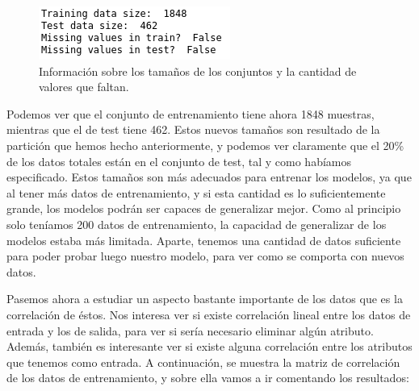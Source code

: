 \documentclass[11pt,a4paper]{article}
\begin{document}
\begin{figure}[H]
    \centering
    \includegraphics[scale=0.6]{img/df_info.png}
    \caption{Información sobre los tamaños de los conjuntos y la cantidad de valores que faltan.}
    \label{fig:train-test-stat}
\end{figure}

Podemos ver que el conjunto de entrenamiento tiene ahora 1848 muestras, mientras que el de test tiene 462. Estos nuevos tamaños son
resultado de la partición que hemos hecho anteriormente, y podemos ver claramente que el 20\% de los datos totales están en el
conjunto de test, tal y como habíamos especificado. Estos tamaños son más adecuados para entrenar los modelos, ya que al tener más
datos de entrenamiento, y si esta cantidad es lo suficientemente grande, los modelos podrán ser capaces de generalizar mejor. Como
al principio solo teníamos 200 datos de entrenamiento, la capacidad de generalizar de los modelos estaba más limitada. Aparte, tenemos
una cantidad de datos suficiente para poder probar luego nuestro modelo, para ver como se comporta con nuevos datos.

Pasemos ahora a estudiar un aspecto bastante importante de los datos que es la correlación de éstos. Nos interesa ver si existe
correlación lineal entre los datos de entrada y los de salida, para ver si sería necesario eliminar algún atributo. Además, también es
interesante ver si existe alguna correlación entre los atributos que tenemos como entrada. A continuación, se muestra la matriz de
correlación de los datos de entrenamiento, y sobre ella vamos a ir comentando los resultados:
\end{document}
